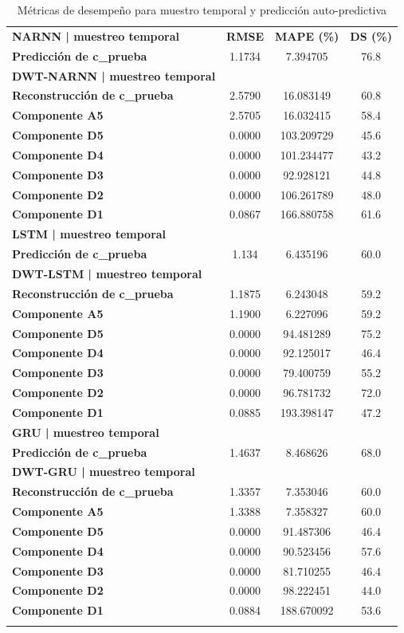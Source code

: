 \begin{longtable}{lccc}
\textbf{NARNN | muestreo temporal} & \textbf{RMSE} & \textbf{MAPE (\%)} & \textbf{DS (\%)} \\
\textbf{Predicción de c\_prueba} & 1.1734 & 7.394705 & 76.8 \\

    \textbf{DWT-NARNN | muestreo temporal} & &  & \\
\textbf{Reconstrucción de c\_prueba} & 2.5790 & 16.083149 & 60.8 \\
\textbf{Componente A5} & 2.5705 & 16.032415 & 58.4 \\
\textbf{Componente D5} & 0.0000 & 103.209729 & 45.6 \\
\textbf{Componente D4} & 0.0000 & 101.234477 & 43.2 \\
\textbf{Componente D3} & 0.0000 & 92.928121 & 44.8 \\
\textbf{Componente D2} & 0.0000 & 106.261789 & 48.0 \\
\textbf{Componente D1} & 0.0867 & 166.880758 & 61.6 \\

\textbf{LSTM | muestreo temporal} & &  & \\
\textbf{Predicción de c\_prueba} & 1.134 & 6.435196 & 60.0 \\
\textbf{DWT-LSTM | muestreo temporal} &  &  &  \\
\textbf{Reconstrucción de c\_prueba} & 1.1875 & 6.243048 & 59.2 \\
\textbf{Componente A5} & 1.1900 & 6.227096 & 59.2 \\
\textbf{Componente D5} & 0.0000 & 94.481289 & 75.2 \\
\textbf{Componente D4} & 0.0000 & 92.125017 & 46.4 \\
\textbf{Componente D3} & 0.0000 & 79.400759 & 55.2 \\
\textbf{Componente D2} & 0.0000 & 96.781732 & 72.0 \\
\textbf{Componente D1} & 0.0885 & 193.398147 & 47.2 \\

\textbf{GRU | muestreo temporal} & &  & \\
\textbf{Predicción de c\_prueba} & 1.4637 & 8.468626 & 68.0 \\
\textbf{DWT-GRU | muestreo temporal} &  &  &  \\
\textbf{Reconstrucción de c\_prueba} & 1.3357 & 7.353046 & 60.0 \\
\textbf{Componente A5} & 1.3388 & 7.358327 & 60.0 \\
\textbf{Componente D5} & 0.0000 & 91.487306 & 46.4 \\
\textbf{Componente D4} & 0.0000 & 90.523456 & 57.6 \\
\textbf{Componente D3} & 0.0000 & 81.710255 & 46.4 \\
\textbf{Componente D2} & 0.0000 & 98.222451 & 44.0 \\
\textbf{Componente D1} & 0.0884 & 188.670092 & 53.6 \\
\caption{Métricas de desempeño para muestro temporal y predicción auto-predictiva}
\label{tab:resultados_prediccion_aregresiva_m_temporal}
\end{longtable}

